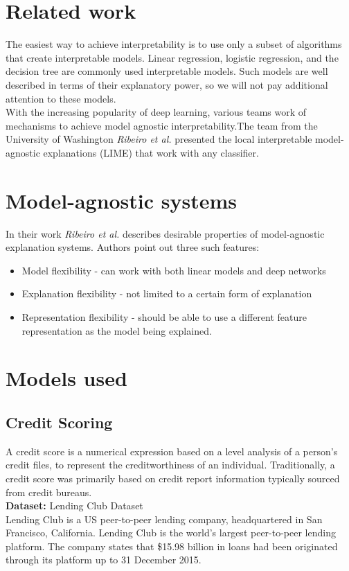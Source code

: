 \section{Related work}
The easiest way to achieve interpretability is to use only a subset of algorithms that create interpretable models. Linear regression, logistic regression, and the decision tree are commonly used interpretable models.\cite{molnar2019}
Such models are well described in terms of their explanatory power, so we will not pay additional attention to these models. \\
With the increasing popularity of deep learning, various teams work of mechanisms to achieve model agnostic interpretability\cite{ribeiro2016model}.The team from the University of Washington \textit{Ribeiro et al.}\cite{RibeiroSG16}  presented the local interpretable model-agnostic explanations (LIME) that work with any classifier. 


\section{Model-agnostic systems}
In their work \textit{Ribeiro et al.}\cite{ribeiro2016model} describes desirable properties of model-agnostic explanation systems. Authors point out three such features:
\begin{itemize}
    \item Model flexibility -  can work with both linear models and deep networks
    \item Explanation flexibility - not limited to a certain form of explanation
    \item Representation flexibility - should be able to use a different feature representation as the model being explained. 
\end{itemize}

\section{Models used}
\subsection{Credit Scoring}
A credit score is a numerical expression based on a level analysis of a person's credit files, to represent the creditworthiness of an individual. Traditionally, a credit score was primarily based on credit report information typically sourced from credit bureaus. \\
\textbf{ Dataset: } Lending Club Dataset \\
Lending Club is a US peer-to-peer lending company, headquartered in San Francisco, California. Lending Club is the world's largest peer-to-peer lending platform. The company states that \$15.98 billion in loans had been originated through its platform up to 31 December 2015. 

